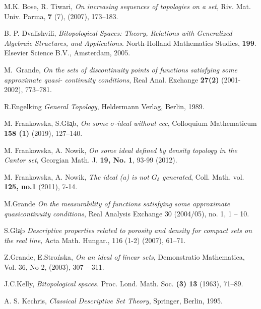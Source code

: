\documentclass[12pt]{amsart}
\theoremstyle{plain}
\theoremstyle{definition}
\theoremstyle{remark}
\begin{document}
\begin{thebibliography}{10}
  M.K. Bose, R. Tiwari, \emph{On increasing sequences of topologies
on a set}, Riv. Mat. Univ. Parma, \textbf{7} (7), (2007), 173--183.

  B. P. Dvalishvili, \emph{Bitopological Spaces: Theory, 
Relations with Generalized Algebraic Structures, and Applications}.
North-Holland Mathematics Studies, \textbf{199}. 
Elsevier Science B.V., Amsterdam, 2005.

 M.~Grande, \emph{On the sets of discontinuity points of functions satisfying some approximate
quasi- continuity conditions}, Real Anal. Exchange \textbf{27(2)} (2001-2002), 773--781.

R.Engelking \emph{General Topology}, Heldermann Verlag, Berlin, 1989.

M. Frankowska, S.G\l{}\c{a}b, 
\emph{On some $\sigma$-ideal without ccc}, Colloquium Mathematicum \textbf{158 (1)} (2019), 127--140.

 M. Frankowska, A. Nowik, \emph{On some ideal defined by density topology in the Cantor set},
Georgian Math. J. \textbf{19, No. 1}, 93-99 (2012).

 M. Frankowska, A. Nowik, \emph{The ideal (a) is not $G_\delta$ generated}, 
Coll. Math. vol. \textbf{125, no.1} (2011), 7-14.

  M.Grande {\em On the measurability of functions satisfying
some approximate quasicontinuity conditions},
{Real Analysis Exchange} {30 (2004/05)}, no. 1, 1 -- 10.

S.G\l{}\c{a}b
{\em Descriptive properties related to porosity and density for compact sets on the real line,}
Acta Math. Hungar., 116 (1-2) (2007), 61--71.

  Z.Grande, E.Stro\'nska, \emph{On an ideal of linear sets},
Demonstratio Mathematica, Vol. 36, No 2, (2003), 
307 -- 311.

J.C.Kelly, \emph{Bitopological spaces.} Proc. Lond. Math. Soc. 
\textbf{(3) 13} (1963), 71--89.

{A. S. Kechris}, {\em Classical Descriptive Set Theory}, Springer, Berlin,
1995. 


\end{thebibliography}
\end{document}
